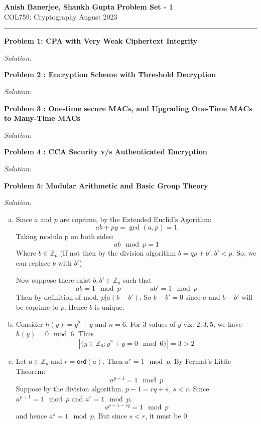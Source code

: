 \documentclass[a4paper, 11pt]{article}
\newcommand{\hr}{\noindent\rule{7in}{2.8pt}}
\newenvironment{solution}
    {\textit{Solution:}}
    {\clearpage}
\newcommand{\prob}[1]{\begin{mdframed}[backgroundcolor=gray!20] \textbf{Problem #1}\end{mdframed}}
\newcommand{\ord}{\mathsf{ord}}
\newcommand{\Z}{\mathbb{Z}}
\begin{document}
\noindent
\large\textbf{Anish Banerjee, Shankh Gupta} \hfill \textbf{Problem Set - 1}   \\
\normalsize COL759: Cryptography \hfill August 2023\\
\hr


\prob{1: CPA with Very Weak Ciphertext Integrity}
\begin{solution}

\end{solution}


\prob{2 : Encryption Scheme with Threshold Decryption}
\begin{solution}
   
\end{solution}

\prob{3 : One-time secure MACs, and Upgrading One-Time MACs to
Many-Time MACs}
\begin{solution}
    
\end{solution}


\prob{4 : CCA Security v/s Authenticated Encryption}
\begin{solution}
    
\end{solution}

\prob{5: Modular Arithmetic and Basic Group Theory}
\begin{solution}
    \begin{enumerate}[(a)]
        \item Since $a$ and $p$ are coprime, by the Extended Euclid's Agorithm:
        $$ ab+py=\gcd(a,p)=1    $$
        Taking modulo p on both sides:
        $$ ab \mod p =1    $$
        Where $b\in\Z_p$ (If not then by the division algorithm $b=qp+b', b'<p$. So, we can replace $b$ with $b'$)
        \vspace{20pt}

        Now suppose there exist $b, b'\in\Z_p$ such that 
        $$ ab=1\mod p \hspace{50pt} ab'=1\mod p    $$
        Then by definition of mod, $p|a(b-b')$. So $b-b'=0$ since $a$ and $b-b'$ will be coprime to $p$. Hence $b$ is unique.

        \item Consider $h(y)=y^2+y$ and $n=6$. For 3 values of $y$ viz. $2,3,5$, we have $h(y)=0\mod 6$. Thus 
        $$|\{y\in\Z_6:y^2+y=0\mod6\}|=3>2$$

        \item Let $a\in\Z_p$ and $r=\ord(a)$. Then $a^r=1\mod p$. By Fermat's Little Theorem:
        $$a^{p-1}=1\mod p$$
        Suppose by the division algorithm, $p-1=rq+s$, $s<r$. Since $a^{p-1}=1\mod p$ and $a^{r}=1\mod p$, $$a^{p-1-rq}=1\mod p$$ and hence $a^{s}=1\mod p$. But since $s<r$, it must be 0.
    \end{enumerate}
\end{solution}
\end{document}
